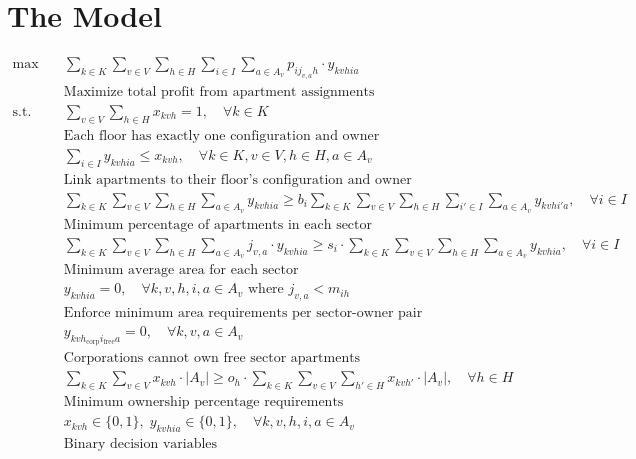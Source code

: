 \documentclass{article}
\begin{document}
\section{The Model}
\begin{align*}
    \max \quad & \sum_{k \in K} \sum_{v \in V} \sum_{h \in H} \sum_{i \in I} \sum_{a \in A_v} p_{i j_{v,a} h} \cdot y_{kvhia} \\
    & \text{Maximize total profit from apartment assignments} \\[6pt]
    \text{s.t.} \quad & \sum_{v \in V} \sum_{h \in H} x_{kvh} = 1, \quad \forall k \in K \\
    & \text{Each floor has exactly one configuration and owner} \\[6pt]
    & \sum_{i \in I} y_{kvhia} \leq x_{kvh}, \quad \forall k \in K, v \in V, h \in H, a \in A_v \\
    & \text{Link apartments to their floor's configuration and owner} \\[6pt]
    & \sum_{k \in K} \sum_{v \in V} \sum_{h \in H} \sum_{a \in A_v} y_{kvhia} \geq b_i \sum_{k \in K} \sum_{v \in V} \sum_{h \in H} \sum_{i' \in I} \sum_{a \in A_v} y_{kvhi'a}, \quad \forall i \in I \\
    & \text{Minimum percentage of apartments in each sector} \\[6pt]
    & \sum_{k \in K} \sum_{v \in V} \sum_{h \in H} \sum_{a \in A_v} j_{v,a} \cdot y_{kvhia} \geq s_i \cdot \sum_{k \in K} \sum_{v \in V} \sum_{h \in H} \sum_{a \in A_v} y_{kvhia}, \quad \forall i \in I \\
    & \text{Minimum average area for each sector} \\[6pt]
    & y_{kvhia} = 0, \quad \forall k, v, h, i, a \in A_v \text{ where } j_{v,a} < m_{ih} \\
    & \text{Enforce minimum area requirements per sector-owner pair} \\[6pt]
    & y_{kvh_{\text{corp}}i_{\text{free}}a} = 0, \quad \forall k, v, a \in A_v \\
    & \text{Corporations cannot own free sector apartments} \\[6pt]
    & \sum_{k \in K} \sum_{v \in V} x_{kvh} \cdot |A_v| \geq o_h \cdot \sum_{k \in K} \sum_{v \in V} \sum_{h' \in H} x_{kvh'} \cdot |A_v|, \quad \forall h \in H \\
    & \text{Minimum ownership percentage requirements} \\[6pt]
    & x_{kvh} \in \{0,1\},\; y_{kvhia} \in \{0,1\}, \quad \forall k, v, h, i, a \in A_v \\
    & \text{Binary decision variables}
\end{align*}
\end{document}
